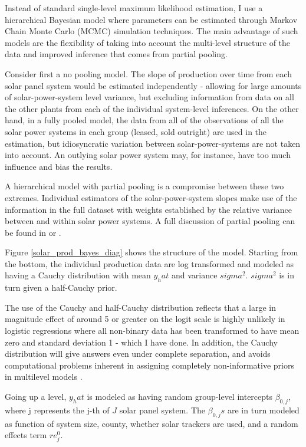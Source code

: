 \documentclass[12pt]{article}
\begin{document}
Instead of standard single-level maximum likelihood estimation,  I use a hierarchical Bayesian model where parameters can be estimated through Markov Chain Monte Carlo (MCMC) simulation techniques. The main advantage of such models are the flexibility of taking into account the multi-level structure of the data and improved inference that comes from partial pooling.

Consider first a no pooling model. The slope of production over time from each solar panel system would be estimated independently - allowing for large amounts of solar-power-system level variance, but excluding information from data on all the other plants from each of the individual system-level inferences. On the other hand, in a fully pooled model, the data from all of the observations of all the solar power systems in each group (leased, sold outright) are used in the estimation, but idiosyncratic variation between solar-power-systems are not taken into account. An outlying solar power system may, for instance, have too much influence and bias the results.

A hierarchical model with partial pooling is a compromise between these two extremes. Individual estimators of the solar-power-system slopes make use of the information in the full dataset with weights established by the relative variance between and within solar power systems. A full discussion of partial pooling can be found in \citet{gelman_bayesian_2013} or \citet{kruschke_doing_2014}.


Figure \ref{solar_prod_bayes_diag} shows the structure of the model. Starting from the bottom, the individual production data are log transformed and modeled as having a Cauchy distribution with mean $y_hat$ and variance $sigma^2$. $sigma^2$ is in turn given a half-Cauchy prior.

The use of the Cauchy and half-Cauchy distribution reflects that a large in magnitude effect of around 5 or greater on the logit scale is highly unlikely in logistic regressions where all non-binary data has been transformed to have mean zero and standard deviation 1 - which I have done. In addition, the Cauchy distribution will give answers even under complete separation, and avoids computational problems inherent in assigning completely non-informative priors in multilevel models \citep{gelman_weakly_2008}.

Going up a level, $y_hat$ is modeled as having random group-level intercepts $\beta_{0,j}$, where j represents the j-th of $J$ solar panel system. The $\beta_{0,j}s$ are in turn modeled as function of system size, county, whether solar trackers are used, and a random effects term $re_j^0$.
\end{document}
